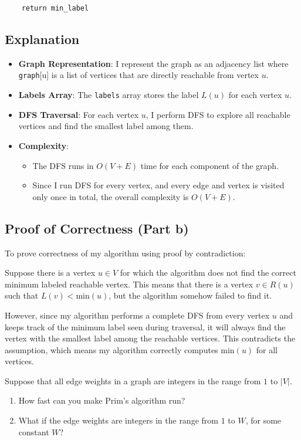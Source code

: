 \documentclass[10pt,letter,notitlepage]{article}
\newcounter{exercise}
\begin{document}
\begin{Answer}[]
\begin{verbatim}
    return min_label
\end{verbatim}

\subsection*{Explanation}
\begin{itemize}
    \item \textbf{Graph Representation}: I represent the graph as an adjacency list where \texttt{graph}[u] is a list of vertices that are directly reachable from vertex \(u\).
    \item \textbf{Labels Array}: The \texttt{labels} array stores the label \(L(u)\) for each vertex \(u\).
    \item \textbf{DFS Traversal}: For each vertex \(u\), I perform DFS to explore all reachable vertices and find the smallest label among them.
    \item \textbf{Complexity}: 
    \begin{itemize}
        \item The DFS runs in \(O(V + E)\) time for each component of the graph.
        \item Since I run DFS for every vertex, and every edge and vertex is visited only once in total, the overall complexity is \(O(V + E)\).
    \end{itemize}
\end{itemize}

\subsection*{Proof of Correctness (Part b)}
To prove correctness of my algorithm using proof by contradiction:

Suppose there is a vertex \(u \in V\) for which the algorithm does not find the correct minimum labeled reachable vertex. This means that there is a vertex \(v \in R(u)\) such that \(L(v) < \text{min}(u)\), but the algorithm somehow failed to find it.

However, since my algorithm performs a complete DFS from every vertex \(u\) and keeps track of the minimum label seen during traversal, it will always find the vertex with the smallest label among the reachable vertices. This contradicts the assumption, which means my algorithm correctly computes \(\text{min}(u)\) for all vertices.


\end{Answer}

\begin{exercise}[(15 marks)]
Suppose that all edge weights in a graph are integers in the range from \(1\) to \(|V|\).
\begin{enumerate}
    \item How fast can you make Prim’s algorithm run?
    \item What if the edge weights are integers in the range from \(1\) to \(W\), for some constant \(W\)?
\end{enumerate}
\end{exercise}
\end{document}
